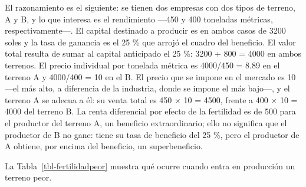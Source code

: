 \documentclass[
  man,
  floatsintext,
  longtable,
  a4paper,
  nolmodern,
  notxfonts,
  notimes,
  12pt,
  colorlinks=true,linkcolor=blue,citecolor=blue,urlcolor=blue]{apa7}
\begin{document}
El razonamiento es el siguiente: se tienen dos empresas con dos tipos de
terreno, A y B, y lo que interesa es el rendimiento ---450 y 400
toneladas métricas, respectivamente---. El capital destinado a producir
es en ambos casos de 3200 soles y la tasa de ganancia es el 25 \% que
arrojó el cuadro del beneficio. El valor total resulta de sumar al
capital anticipado el 25 \%: 3200 + 800 = 4000 en ambos terrenos. El
precio individual por tonelada métrica es 4000/450 = 8.89 en el terreno
A y 4000/400 = 10 en el B. El precio que se impone en el mercado es 10
---el más alto, a diferencia de la industria, donde se impone el más
bajo---, y el terreno A se adecua a él: su venta total es 450 × 10 =
4500, frente a 400 × 10 = 4000 del terreno B. La renta diferencial por
efecto de la fertilidad es de 500 para el productor del terreno A, un
beneficio extraordinario; ello no significa que el productor de B no
gane: tiene su tasa de beneficio del 25 \%, pero el productor de A
obtiene, por encima del beneficio, un superbeneficio.

La Tabla~\ref{tbl-fertilidadpeor} muestra qué ocurre cuando entra en
producción un terreno peor.
\end{document}
